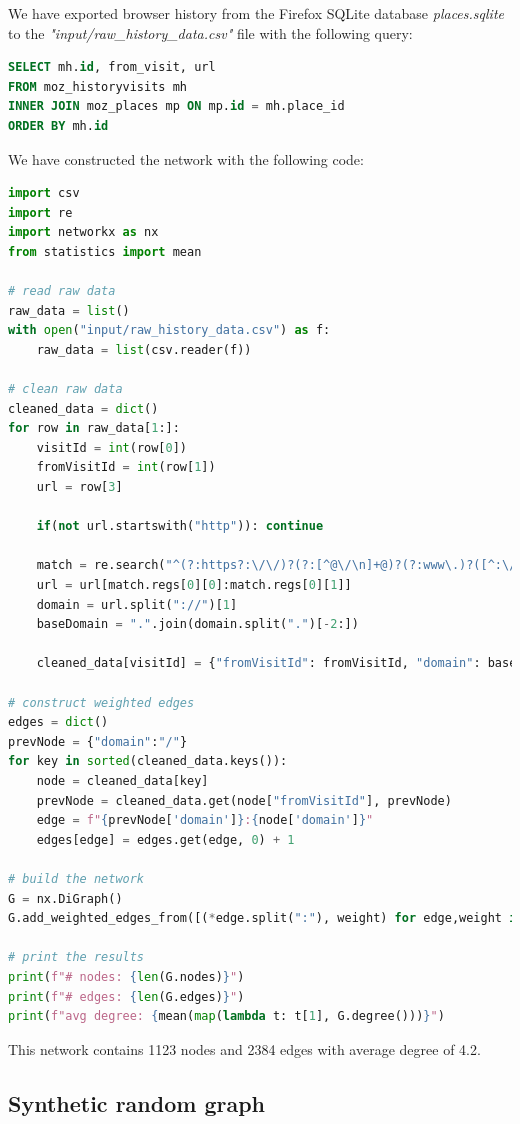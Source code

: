 \documentclass[11pt,a4paper]{article}
\begin{document}
We have exported browser history from the Firefox SQLite database \textit{places.sqlite} to the \textit{"input/raw\_history\_data.csv"} file with the following query:

\begin{lstlisting}[language=SQL, caption=SQLite query]
SELECT mh.id, from_visit, url
FROM moz_historyvisits mh 
INNER JOIN moz_places mp ON mp.id = mh.place_id
ORDER BY mh.id
\end{lstlisting}

We have constructed the network with the following code:

\begin{lstlisting}[language=Python, caption=src/part2.py]
import csv
import re
import networkx as nx
from statistics import mean 

# read raw data
raw_data = list()
with open("input/raw_history_data.csv") as f:
	raw_data = list(csv.reader(f))

# clean raw data
cleaned_data = dict()
for row in raw_data[1:]:
	visitId = int(row[0])
	fromVisitId = int(row[1])
	url = row[3]

	if(not url.startswith("http")): continue

	match = re.search("^(?:https?:\/\/)?(?:[^@\/\n]+@)?(?:www\.)?([^:\/?\n]+)", url)
	url = url[match.regs[0][0]:match.regs[0][1]]
	domain = url.split("://")[1]
	baseDomain = ".".join(domain.split(".")[-2:])

	cleaned_data[visitId] = {"fromVisitId": fromVisitId, "domain": baseDomain}

# construct weighted edges
edges = dict()
prevNode = {"domain":"/"}
for key in sorted(cleaned_data.keys()):
	node = cleaned_data[key]
	prevNode = cleaned_data.get(node["fromVisitId"], prevNode)
	edge = f"{prevNode['domain']}:{node['domain']}"
	edges[edge] = edges.get(edge, 0) + 1

# build the network
G = nx.DiGraph()
G.add_weighted_edges_from([(*edge.split(":"), weight) for edge,weight in edges.items()])

# print the results
print(f"# nodes: {len(G.nodes)}")
print(f"# edges: {len(G.edges)}")
print(f"avg degree: {mean(map(lambda t: t[1], G.degree()))}")
\end{lstlisting}

This network contains 1123 nodes and 2384 edges with average degree of 4.2.

\subsection*{Synthetic random graph}
\end{document}
